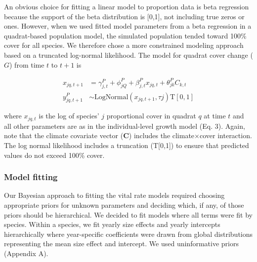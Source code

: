 \documentclass[12pt,]{article}
\begin{document}
An obvious choice for fitting a linear model to proportion data is beta
regression because the support of the beta distribution is {[}0,1{]},
not including true zeros or ones. However, when we used fitted model
parameters from a beta regression in a quadrat-based population model,
the simulated population tended toward 100\% cover for all species. We
therefore chose a more constrained modeling approach based on a
truncated log-normal likelihood. The model for quadrat cover change
($G$) from time $t$ to $t+1$ is

\begin{align}
x_{jq,t+1} &= \gamma^{P}_{j,t} + \phi^{P}_{jQ} + \beta^{P}_{j,t}x_{jq,t} + \theta^{P}_{jk}C_{k,t} \\
y^{P}_{jq,t+1} &\sim \text{LogNormal}(x_{jq,t+1}, \tau{j}) \text{T}[0,1]
\end{align}

where $x_{jq,t}$ is the log of species' $j$ proportional cover in
quadrat $q$ at time $t$ and all other parameters are as in the
individual-level growth model (Eq. 3). Again, note that the climate
covariate vector (\textbf{C}) includes the climate$\times$cover
interaction. The log normal likelihood includes a truncation
(T{[}0,1{]}) to ensure that predicted values do not exceed 100\% cover.

\subsubsection{Model fitting}\label{model-fitting}

Our Bayesian approach to fitting the vital rate models required choosing
appropriate priors for unknown parameters and deciding which, if any, of
those priors should be hierarchical. We decided to fit models where all
terms were fit by species. Within a species, we fit yearly size effects
and yearly intercepts hierarchically where year-specific coefficients
were drawn from global distributions representing the mean size effect
and intercept. We used uninformative priors (Appendix A).
\end{document}
